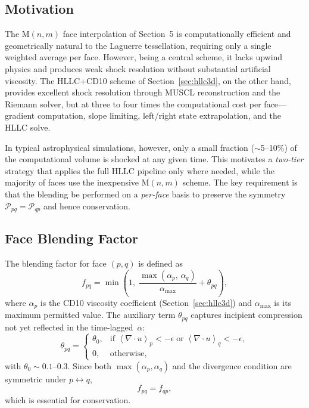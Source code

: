 \documentclass[twocolumn]{aastex63}
\newcommand{\vel}{{u}}
\newcommand{\pressure}[0]{\mathcal{P}}
\begin{document}
\subsection{Motivation}

The M$(n,m)$ face interpolation of Section~5 is computationally
efficient and geometrically natural to the Laguerre tessellation,
requiring only a single weighted average per face.
However, being a central scheme, it lacks upwind physics and
produces weak shock resolution without substantial artificial
viscosity.
The HLLC+CD10 scheme of Section~\ref{sec:hllc3d}, on the other
hand, provides excellent shock resolution through MUSCL
reconstruction and the Riemann solver, but at three to four times
the computational cost per face---gradient computation, slope
limiting, left/right state extrapolation, and the HLLC solve.

In typical astrophysical simulations, however, only a small
fraction ($\sim$5--10\%) of the computational volume is shocked
at any given time.
This motivates a \emph{two-tier} strategy that applies the
full HLLC pipeline only where needed, while the majority of
faces use the inexpensive M$(n,m)$ scheme.
The key requirement is that the blending be performed on a
\emph{per-face} basis to preserve the symmetry
$\pressure_{pq} = \pressure_{qp}$ and hence conservation.

\subsection{Face Blending Factor}

The blending factor for face $(p,q)$ is defined as
\begin{equation}\label{eq:fpq}
  f_{pq} = \min\!\left(1,\;
    \frac{\max(\alpha_p,\,\alpha_q)}{\alpha_{\max}}
    + \theta_{pq}\right),
\end{equation}
where $\alpha_p$ is the CD10 viscosity coefficient
(Section~\ref{sec:hllc3d}) and
$\alpha_{\max}$ is its maximum permitted value.
The auxiliary term $\theta_{pq}$ captures incipient
compression not yet reflected in the time-lagged~$\alpha$:
\begin{equation}\label{eq:theta}
  \theta_{pq} = \begin{cases}
    \theta_0, & \text{if }
      \left<\nabla\!\cdot\!\vel\right>_p < -\epsilon
      \;\text{or}\;
      \left<\nabla\!\cdot\!\vel\right>_q < -\epsilon, \\[4pt]
    0, & \text{otherwise},
  \end{cases}
\end{equation}
with $\theta_0 \sim 0.1$--$0.3$.
Since both $\max(\alpha_p,\alpha_q)$ and the divergence
condition are symmetric under $p\leftrightarrow q$,
\begin{equation}
  f_{pq} = f_{qp},
\end{equation}
which is essential for conservation.
\end{document}
